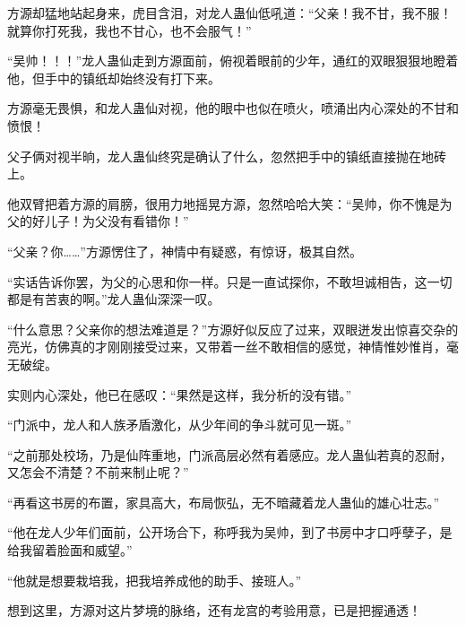 \begin{this_body}
方源却猛地站起身来，虎目含泪，对龙人蛊仙低吼道：“父亲！我不甘，我不服！就算你打死我，我也不甘心，也不会服气！”

“吴帅！！！”龙人蛊仙走到方源面前，俯视着眼前的少年，通红的双眼狠狠地瞪着他，但手中的镇纸却始终没有打下来。

方源毫无畏惧，和龙人蛊仙对视，他的眼中也似在喷火，喷涌出内心深处的不甘和愤恨！

父子俩对视半晌，龙人蛊仙终究是确认了什么，忽然把手中的镇纸直接抛在地砖上。

他双臂把着方源的肩膀，很用力地摇晃方源，忽然哈哈大笑：“吴帅，你不愧是为父的好儿子！为父没有看错你！”

“父亲？你……”方源愣住了，神情中有疑惑，有惊讶，极其自然。

“实话告诉你罢，为父的心思和你一样。只是一直试探你，不敢坦诚相告，这一切都是有苦衷的啊。”龙人蛊仙深深一叹。

“什么意思？父亲你的想法难道是？”方源好似反应了过来，双眼迸发出惊喜交杂的亮光，仿佛真的才刚刚接受过来，又带着一丝不敢相信的感觉，神情惟妙惟肖，毫无破绽。

实则内心深处，他已在感叹：“果然是这样，我分析的没有错。”

“门派中，龙人和人族矛盾激化，从少年间的争斗就可见一斑。”

“之前那处校场，乃是仙阵重地，门派高层必然有着感应。龙人蛊仙若真的忍耐，又怎会不清楚？不前来制止呢？”

“再看这书房的布置，家具高大，布局恢弘，无不暗藏着龙人蛊仙的雄心壮志。”

“他在龙人少年们面前，公开场合下，称呼我为吴帅，到了书房中才口呼孽子，是给我留着脸面和威望。”

“他就是想要栽培我，把我培养成他的助手、接班人。”

想到这里，方源对这片梦境的脉络，还有龙宫的考验用意，已是把握通透！

\end{this_body}

